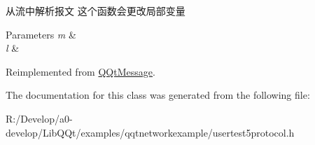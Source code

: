 从流中解析报文 这个函数会更改局部变量 


\begin{DoxyParams}{Parameters}
{\em m} & \\
\hline
{\em l} & \\
\hline
\end{DoxyParams}


Reimplemented from \mbox{\hyperlink{class_q_qt_message_a0bc25669bdd61490b1d8df6d77565f31}{Q\+Qt\+Message}}.



The documentation for this class was generated from the following file\+:\begin{DoxyCompactItemize}
\item 
R\+:/\+Develop/a0-\/develop/\+Lib\+Q\+Qt/examples/qqtnetworkexample/usertest5protocol.\+h\end{DoxyCompactItemize}
